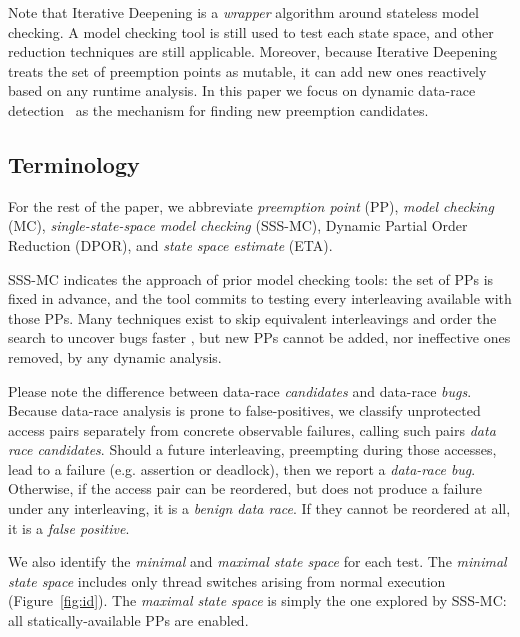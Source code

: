 Note that Iterative Deepening is a {\em wrapper} algorithm around stateless model checking.
A model checking tool is still used to test each state space, and other reduction techniques are still applicable.
Moreover, because Iterative Deepening treats the set of preemption points as mutable,
it can add new ones reactively based on any runtime analysis.
In this paper we focus on dynamic data-race detection~\cite{tsan} as the mechanism for finding new preemption candidates.

\subsection{Terminology}

For the rest of the paper, we abbreviate {\em preemption point} (PP),
{\em model checking} (MC),
{\em single-state-space model checking} (SSS-MC),%
Dynamic Partial Order Reduction (DPOR), and {\em state space estimate} (ETA).

SSS-MC indicates the approach of prior model checking tools:
the set of PPs is fixed in advance, and the tool commits to testing every interleaving available with those PPs.
Many techniques exist to skip equivalent interleavings and order the search to uncover bugs faster \cite{dpor,demeter,chess-icb,gambit},
but new PPs cannot be added, nor ineffective ones removed, by any dynamic analysis.

Please note the difference between data-race {\em candidates} and data-race {\em bugs}.
Because data-race analysis is prone to false-positives,
we classify unprotected access pairs separately from concrete observable failures, %
calling such pairs {\em data race candidates}.
Should a future interleaving, preempting during those accesses,
lead to a failure (e.g. assertion or deadlock), then we report a {\em data-race bug}.
Otherwise, if the access pair can be reordered, but does not produce a failure under any interleaving, it is a {\em benign data race}.
If they cannot be reordered at all, it is a {\em false positive}.

We also identify the {\em minimal} and {\em maximal state space} for each test.
The {\em minimal state space} includes only thread switches arising from normal execution (Figure~\ref{fig:id}).
The {\em maximal state space} is simply the one explored by SSS-MC: all statically-available PPs are enabled.


